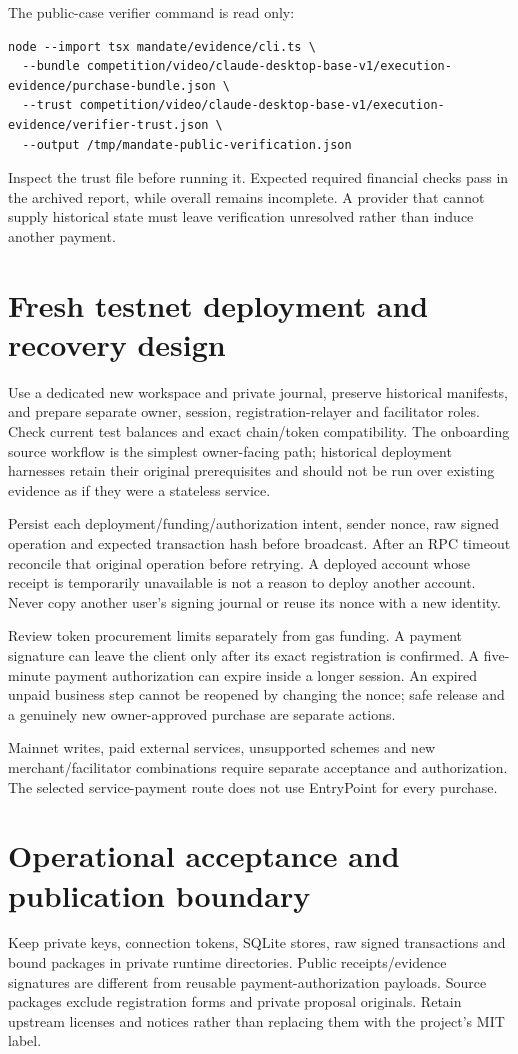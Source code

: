 The public-case verifier command is read only:
\begin{lstlisting}
node --import tsx mandate/evidence/cli.ts \
  --bundle competition/video/claude-desktop-base-v1/execution-evidence/purchase-bundle.json \
  --trust competition/video/claude-desktop-base-v1/execution-evidence/verifier-trust.json \
  --output /tmp/mandate-public-verification.json
\end{lstlisting}
Inspect the trust file before running it. Expected required financial checks pass in the archived report, while overall remains incomplete. A provider that cannot supply historical state must leave verification unresolved rather than induce another payment.

\section{Fresh testnet deployment and recovery design}
Use a dedicated new workspace and private journal, preserve historical manifests, and prepare separate owner, session, registration-relayer and facilitator roles. Check current test balances and exact chain/token compatibility. The onboarding source workflow is the simplest owner-facing path; historical deployment harnesses retain their original prerequisites and should not be run over existing evidence as if they were a stateless service.

Persist each deployment/funding/authorization intent, sender nonce, raw signed operation and expected transaction hash before broadcast. After an RPC timeout reconcile that original operation before retrying. A deployed account whose receipt is temporarily unavailable is not a reason to deploy another account. Never copy another user's signing journal or reuse its nonce with a new identity.

Review token procurement limits separately from gas funding. A payment signature can leave the client only after its exact registration is confirmed. A five-minute payment authorization can expire inside a longer session. An expired unpaid business step cannot be reopened by changing the nonce; safe release and a genuinely new owner-approved purchase are separate actions.

Mainnet writes, paid external services, unsupported schemes and new merchant/facilitator combinations require separate acceptance and authorization. The selected service-payment route does not use EntryPoint for every purchase.

\section{Operational acceptance and publication boundary}
Keep private keys, connection tokens, SQLite stores, raw signed transactions and bound packages in private runtime directories. Public receipts/evidence signatures are different from reusable payment-authorization payloads. Source packages exclude registration forms and private proposal originals. Retain upstream licenses and notices rather than replacing them with the project's MIT label.


